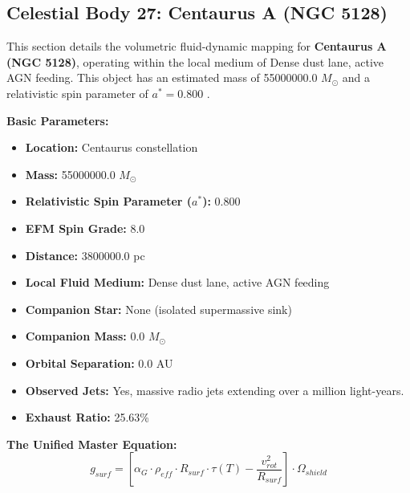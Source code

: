 \documentclass[11pt, a4paper]{article}
\begin{document}
\clearpage
\subsection{Celestial Body 27: Centaurus A (NGC 5128)}
This section details the volumetric fluid-dynamic mapping for \textbf{Centaurus A (NGC 5128)}, operating within the local medium of Dense dust lane, active AGN feeding. This object has an estimated mass of 55000000.0 $M_{\odot}$ and a relativistic spin parameter of $a^* = 0.800$ \cite{eventhorizontelescopecollaboration2021, ned}.

\vspace{0.5em}
\noindent \textbf{Basic Parameters:}
\begin{itemize}
  \item \textbf{Location:} Centaurus constellation
  \item \textbf{Mass:} 55000000.0 $M_{\odot}$
  \item \textbf{Relativistic Spin Parameter ($a^*$):} 0.800
  \item \textbf{EFM Spin Grade:} 8.0
  \item \textbf{Distance:} 3800000.0 pc
  \item \textbf{Local Fluid Medium:} Dense dust lane, active AGN feeding
  \item \textbf{Companion Star:} None (isolated supermassive sink)
  \item \textbf{Companion Mass:} 0.0 $M_{\odot}$
  \item \textbf{Orbital Separation:} 0.0 AU
  \item \textbf{Observed Jets:} Yes, massive radio jets extending over a million light-years.
  \item \textbf{Exhaust Ratio:} 25.63\%
\end{itemize}

\vspace{0.5em}
\noindent \textbf{The Unified Master Equation:}
$$ g_{surf} = \left[ \alpha_G \cdot \rho_{eff} \cdot R_{surf} \cdot \tau(T) - \frac{v_{rot}^2}{R_{surf}} \right] \cdot \Omega_{shield} $$
\end{document}
